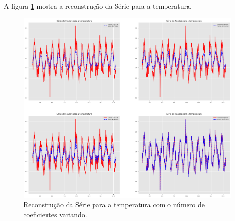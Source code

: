 \documentclass[12pt,a4paper,portuguese]{article}
\begin{document}
A figura \ref{fig:lista4-3e} mostra a reconstrução da Série para a temperatura.
\begin{figure}[H]
	\centering
	\includegraphics[width=1\linewidth]{lista4-3e}
	\caption{Reconstrução da Série para a temperatura com o número de coeficientes variando.}
	\label{fig:lista4-3e}
\end{figure}
\end{document}
